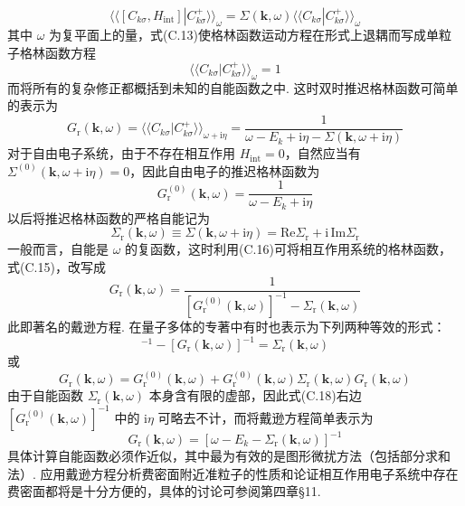 \begin{equation}
\langle\langle[C_{k\sigma},H_{\mathrm{int}}]
|C_{k\sigma}^{+}\rangle\rangle_{\omega}
=\Sigma(\boldsymbol{k},\omega)
\langle\langle C_{k\sigma}|C_{k\sigma}^{+}\rangle\rangle_{\omega}
\end{equation}
其中 $\omega$ 为复平面上的量，式(C.13)使格林函数运动方程在形式上退耦而写成单粒子格林函数方程
\begin{equation}
[\omega-E_{k}-\Sigma(\boldsymbol{k},\omega)]
\langle\langle C_{k\sigma}|C_{k\sigma}^{+}\rangle\rangle_{\omega}=1
\end{equation}
而将所有的复杂修正都概括到未知的自能函数之中. 这时双时推迟格林函数可简单的表示为
\begin{equation}
G_{\mathrm{r}}(\boldsymbol{k},\omega)
=\langle\langle C_{k\sigma}|C_{k\sigma}^{+}\rangle\rangle_{\omega+\mathrm{i}\eta}
=\frac{1}{\omega-E_{k}+\mathrm{i}\eta-\Sigma(\boldsymbol{k},\omega+\mathrm{i}\eta)}
\end{equation}
对于自由电子系统，由于不存在相互作用 $H_{\mathrm{int}}=0$，自然应当有 $\Sigma^{(0)}(\boldsymbol{k},\omega+\mathrm{i}\eta)=0$，因此自由电子的推迟格林函数为
\begin{equation}
G_{\mathrm{r}}^{(0)}(\boldsymbol{k},\omega)
=\frac{1}{\omega-E_{k}+\mathrm{i}\eta}
\end{equation}
以后将推迟格林函数的严格自能记为
\begin{equation}
\Sigma_{\mathrm{r}}(\boldsymbol{k},\omega)
\equiv\Sigma(\boldsymbol{k},\omega+\mathrm{i}\eta)
=\mathrm{Re}\Sigma_{\mathrm{r}}
+\mathrm{i}\,\mathrm{Im}\Sigma_{\mathrm{r}}
\end{equation}
一般而言，自能是 $\omega$ 的复函数，这时利用(C.16)可将相互作用系统的格林函数，式(C.15)，改写成
\begin{equation}
G_{\mathrm{r}}(\boldsymbol{k},\omega)
=\frac{1}{[G_{\mathrm{r}}^{(0)}(\boldsymbol{k},\omega)]^{-1}
-\Sigma_{\mathrm{r}}(\boldsymbol{k},\omega)}
\end{equation}
此即著名的戴逊方程. 在量子多体的专著中有时也表示为下列两种等效的形式：
\begin{equation}
[G_{\mathrm{r}}^{(0)}(\boldsymbol{k},\omega)]^{-1}
-[G_{\mathrm{r}}(\boldsymbol{k},\omega)]^{-1}
=\Sigma_{\mathrm{r}}(\boldsymbol{k},\omega)
\end{equation}
或
\begin{equation}
G_{\mathrm{r}}(\boldsymbol{k},\omega)
=G_{\mathrm{r}}^{(0)}(\boldsymbol{k},\omega)
+G_{\mathrm{r}}^{(0)}(\boldsymbol{k},\omega)
\Sigma_{\mathrm{r}}(\boldsymbol{k},\omega)
G_{\mathrm{r}}(\boldsymbol{k},\omega)
\end{equation}
由于自能函数 $\Sigma_{\mathrm{r}}(\boldsymbol{k},\omega)$ 本身含有限的虚部，因此式(C.18)右边 $[G_{\mathrm{r}}^{(0)}(\boldsymbol{k},\omega)]^{-1}$ 中的 $\mathrm{i}\eta$ 可略去不计，而将戴逊方程简单表示为
\begin{equation}
G_{\mathrm{r}}(\boldsymbol{k},\omega)
=[\omega-E_{k}-\Sigma_{\mathrm{r}}(\boldsymbol{k},\omega)]^{-1}
\end{equation}
具体计算自能函数必须作近似，其中最为有效的是图形微扰方法（包括部分求和法）. 应用戴逊方程分析费密面附近准粒子的性质和论证相互作用电子系统中存在费密面都将是十分方便的，具体的讨论可参阅第四章§11.
